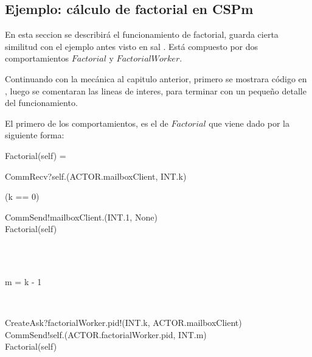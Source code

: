 \subsection{Ejemplo: cálculo de factorial en CSPm}
En esta seccion se describirá el funcionamiento de factorial, guarda cierta similitud con el ejemplo antes visto en sal \SAL. Está compuesto por dos comportamientos $Factorial$ y $FactorialWorker$.

Continuando con la mecánica al capitulo anterior, primero se mostrara código en \CSPm, luego se comentaran las lineas de interes, para terminar con un pequeño detalle del funcionamiento.

El primero de los comportamientos, es el de $Factorial$ que viene dado por la siguiente forma:
\begin{process}
Factorial(self) = {} \\ \quad
  \begin{block}
  CommRecv?self.(ACTOR.mailboxClient, INT.k) \then {} \\ \quad
    \begin{block}
    \If (k == 0) \Then {} \\ \quad
      \begin{block} 
      CommSend!mailboxClient.(INT.1, None) \then \\
      Factorial(self) 
      \end{block} \\
    \Else {} \\ \quad
      \begin{block}
      \begin{declaration}
     m  = k - 1 
	\end{declaration} \\
	\begin{within}
	CreateAsk?factorialWorker.pid!(INT.k, ACTOR.mailboxClient) \then \\
	CommSend!self.(ACTOR.factorialWorker.pid, INT.m) \then \\
	Factorial(self)
	\end{within}
      \end{block}
    \end{block}
  \end{block}
\end{process}


